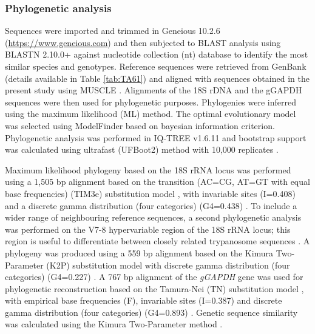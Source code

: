 \documentclass[a4paper, nobind]{templates/ociamthesis}
\begin{document}
\hypertarget{phylogenetic-analysis}{%
\subsubsection{Phylogenetic analysis}\label{phylogenetic-analysis}}

Sequences were imported and trimmed in Geneious 10.2.6 (\url{https://www.geneious.com}) and then subjected to BLAST analysis using BLASTN 2.10.0+ \autocite{zhangGreedyAlgorithmAligning2000} against nucleotide collection (nt) database \autocite{morgulisDatabaseIndexingProduction2008} to identify the most similar species and genotypes. Reference sequences were retrieved from GenBank \autocite{bensonGenBank2017} (details available in Table \ref{tab:TA61}) and aligned with sequences obtained in the present study using MUSCLE \autocite{edgarMUSCLEMultipleSequence2004}. Alignments of the 18S rDNA and the gGAPDH sequences were then used for phylogenetic purposes. Phylogenies were inferred using the maximum likelihood (ML) method. The optimal evolutionary model was selected using ModelFinder \autocite{kalyaanamoorthyModelFinderFastModel2017} based on bayesian information criterion. Phylogenetic analysis was performed in IQ-TREE v1.6.11 \autocite{nguyenIQTREEFastEffective2015} and bootstrap support was calculated using ultrafast (UFBoot2) method with 10,000 replicates \autocite{hoangUFBoot2ImprovingUltrafast2018}.

Maximum likelihood phylogeny based on the 18S rRNA locus was performed using a 1,505 bp alignment based on the transition (AC=CG, AT=GT with equal base frequencies) (TIM3e) substitution model \autocite{posadaUsingMODELTESTPAUP2003}, with invariable sites (I=0.408) and a discrete gamma distribution (four categories) (G4=0.438) \autocite{guMaximumLikelihoodEstimation1995}. To include a wider range of neighbouring reference sequences, a second phylogenetic analysis was performed on the V7-8 hypervariable region of the 18S rRNA locus; this region is useful to differentiate between closely related trypanosome sequences \autocite{hamiltonResolvingRelationshipsAustralian2011}. A phylogeny was produced using a 559 bp alignment based on the Kimura Two-Parameter (K2P) substitution model \autocite{kimuraSimpleMethodEstimating1980} with discrete gamma distribution (four categories) (G4=0.227) \autocite{guMaximumLikelihoodEstimation1995}. A 767 bp alignment of the \emph{gGAPDH} gene was used for phylogenetic reconstruction based on the Tamura-Nei (TN) substitution model \autocite{tamuraEstimationNumberNucleotide1993}, with empirical base frequencies (F), invariable sites (I=0.387) and discrete gamma distribution (four categories) (G4=0.893) \autocite{guMaximumLikelihoodEstimation1995}. Genetic sequence similarity was calculated using the Kimura Two-Parameter method \autocite{tamuraEstimationNumberNucleotide1993}.
\end{document}
